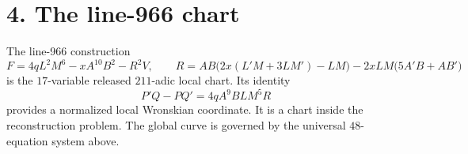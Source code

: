 \documentclass[11pt]{article}
\begin{document}
\section*{4. The line-966 chart}
The line-966 construction
\[
 F=4qL^2M^6-xA^{10}B^2-R^2V,
 \qquad
 R=AB\bigl(2x(L'M+3LM')-LM\bigr)-2xLM\bigl(5A'B+AB'\bigr)
\]
is the $17$-variable released $211$-adic local chart.  Its identity
\[
 P'Q-PQ'=4qA^9BLM^5R
\]
provides a normalized local Wronskian coordinate.  It is a chart inside the
reconstruction problem.  The global curve is governed by the universal
$48$-equation system above.
\end{document}
